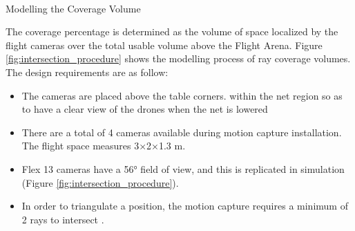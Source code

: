 \begin{marginfigure}%
    \raggedright
    \\
    \caption{Modelling the Coverage Volume}
    \label{fig:intersection_procedure}
\end{marginfigure}

The coverage percentage is determined as the volume of space localized by the flight cameras over the total usable volume above the Flight Arena. Figure \ref{fig:intersection_procedure} shows the modelling process of ray coverage volumes. The design requirements are as follow:
\begin{itemize}
\item The cameras are placed above the table corners. within the net region so as to have a clear view of the drones when the net is lowered
\item There are a total of 4 cameras available during motion capture installation. The flight space measures 3×2×1.3 m.
\item Flex 13 cameras have a 56° field of view, and this is replicated in simulation (Figure \ref{fig:intersection_procedure}). 
\item In order to triangulate a position, the motion capture requires a minimum of 2 rays to intersect \cite{optitrack_docs}.
\end{itemize}

